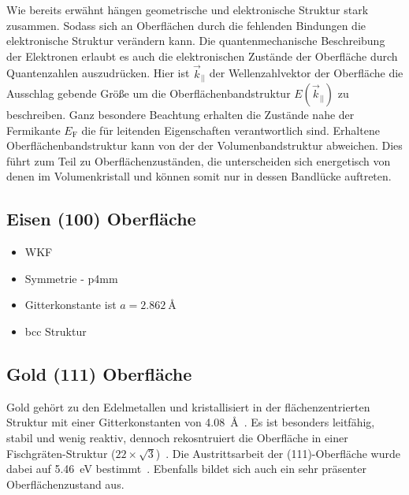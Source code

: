         Wie bereits erwähnt hängen geometrische und elektronische Struktur stark zusammen.
        Sodass sich an Oberflächen durch die fehlenden Bindungen die elektronische Struktur verändern kann.
        Die quantenmechanische Beschreibung der Elektronen erlaubt es auch die elektronischen Zustände der Oberfläche durch Quantenzahlen auszudrücken.
        Hier ist $\vec{k}_{||}$ der Wellenzahlvektor der Oberfläche die Ausschlag gebende Größe um die Oberflächenbandstruktur $E(\vec{k}_{||})$ zu beschreiben.
        Ganz besondere Beachtung erhalten die Zustände nahe der Fermikante $E_\text{F}$ die für leitenden Eigenschaften verantwortlich sind.
        Erhaltene Oberflächenbandstruktur kann von der der Volumenbandstruktur abweichen.
        Dies führt zum Teil zu Oberflächenzuständen, die unterscheiden sich energetisch von denen im Volumenkristall und können somit nur in dessen Bandlücke auftreten.
    

        \subsection{Eisen (100) Oberfläche}
            \begin{itemize}
                \item WKF
                \item Symmetrie - p4mm
                \item Gitterkonstante ist $a = \SI{2.862}{\angstrom}$~\cite{springer_database}
                \item bcc Struktur
            \end{itemize}
        
        \subsection{Gold (111) Oberfläche}
            Gold gehört zu den Edelmetallen und kristallisiert in der flächenzentrierten Struktur mit einer Gitterkonstanten von \SI{4.08}{\angstrom}~\cite{Marx}.
            Es ist besonders leitfähig, stabil und wenig reaktiv, dennoch rekosntruiert die Oberfläche in einer Fischgräten-Struktur ($\num{22} \times \sqrt{\num{3}}$)~\cite{5A_3}.
            Die Austrittsarbeit der (111)-Oberfläche wurde dabei auf \SI{5.46}{\electronvolt} bestimmt~\cite{5A_4}.
            Ebenfalls bildet sich auch ein sehr präsenter Oberflächenzustand aus.
            
